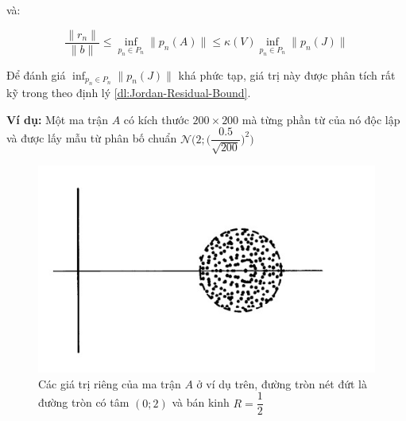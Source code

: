 \documentclass[14pt, a4paper]{article}
\numberwithin{equation}{section}
\numberwithin{algorithm}{section}
\numberwithin{figure}{section}
\numberwithin{dl}{section}
\numberwithin{md}{section}
\numberwithin{bd}{section}
\numberwithin{dn}{section}
\numberwithin{hq}{section}
\begin{document}
và:

\begin{equation}
    \dfrac{\lVert r_n \rVert}{\lVert b \rVert} \leq \inf_{p_n \in P_n} \lVert p_n(A) \rVert \leq \kappa(V) \inf_{p_n \in P_n} \lVert p_n(J) \rVert
\end{equation}

Để đánh giá $\inf_{p_n \in P_n} \lVert p_n(J) \rVert$ khá phức tạp, giá trị này được phân tích rất kỹ trong \cite{tichy2005worst} theo định lý \ref{dl:Jordan-Residual-Bound}.

\textbf{Ví dụ:} Một ma trận $A$ có kích thước $200\times 200$ mà từng phần từ của nó độc lập và được lấy mẫu từ phân bố chuẩn $\mathcal{N}\Bigg(2;\Big(\dfrac{0.5}{\sqrt{200}} \Big)^2 \Bigg)$

\begin{figure}[h!] \centering

    \includegraphics[scale=1.0]{A-Eigenvalues.jpg}
    \caption{Các giá trị riêng của ma trận $A$ ở ví dụ trên, đường tròn nét đứt là đường tròn có tâm $(0; 2)$ và bán kinh $R=\dfrac{1}{2}$ \cite{trefethen1997numerical}}

    \label{fig:A-Eigenvalues}
\end{figure}
\end{document}
